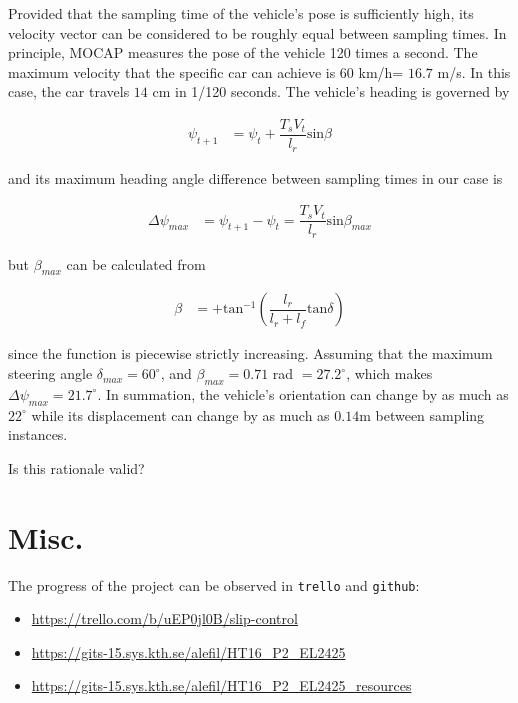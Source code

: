 \documentclass[oneside,12pt]{article}
\begin{document}
\begin{itemize}
    Provided that the sampling time of the vehicle's pose is sufficiently high,
    its velocity vector can be considered to be roughly equal between sampling
    times. In principle, MOCAP measures the pose of the vehicle 120 times a
    second. The maximum velocity that the specific car can achieve is $60$ km/h=
    $16.7$ m/s. In this case, the car travels $14$ cm in 1/120 seconds. The
    vehicle's heading is governed by

    \begin{align}
      \psi_{t+1} &= \psi_t + \dfrac{T_s V_t}{l_r} \text{sin}\beta
    \end{align}

    and its maximum heading angle difference between sampling times in our case
    is

    \begin{align}
      \Delta\psi_{max} &= \psi_{t+1} - \psi_t = \dfrac{T_s V_t}{l_r} \text{sin}\beta_{max}
    \end{align}

    but $\beta_{max}$ can be calculated from

    \begin{align}
      \beta &= +\text{tan}^{-1} (\dfrac{l_r}{l_r + l_f} \text{tan}\delta)
    \end{align}

    since the function is piecewise strictly increasing. Assuming that the
    maximum steering angle $\delta_{max} = 60^{\circ}$, and $\beta_{max} = 0.71$
    rad $= 27.2^{\circ}$, which makes $\Delta\psi_{max} = 21.7^{\circ}.$ In
    summation, the vehicle's orientation can change by as much
    as $22^\circ$ while its displacement can change by as much as $0.14$m
    between sampling instances.

    Is this rationale valid?

\end{itemize}

\section{Misc.}

The progress of the project can be observed in \texttt{trello} and \texttt{github}:

\begin{itemize}
  \item \url{https://trello.com/b/uEP0jl0B/slip-control}
  \item \url{https://gits-15.sys.kth.se/alefil/HT16_P2_EL2425}
  \item \url{https://gits-15.sys.kth.se/alefil/HT16_P2_EL2425_resources}
\end{itemize}
\end{document}
